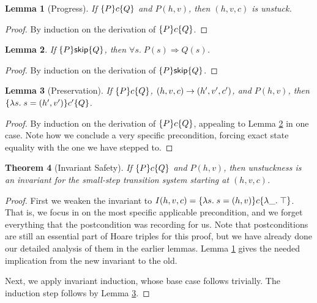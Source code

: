 \documentclass{amsbook}
\newtheorem{theorem}{Theorem}[chapter]
\newtheorem{lemma}[theorem]{Lemma}
\theoremstyle{definition}
\theoremstyle{remark}
\numberwithin{section}{chapter}
\numberwithin{equation}{chapter}
\begin{document}
\begin{lemma}[Progress]\label{hoare_progress}
  If $\{P\} c \{Q\}$ and $P(h, v)$, then $(h, v, c)$ is unstuck.
\end{lemma}
\begin{proof}
  By induction on the derivation of $\{P\} c \{Q\}$.
\end{proof}

\begin{lemma}\label{hoare_skip}
  If $\{P\} \mathsf{skip} \{Q\}$, then $\forall s. \; P(s) \Rightarrow Q(s)$.
\end{lemma}
\begin{proof}
  By induction on the derivation of $\{P\} \mathsf{skip} \{Q\}$.
\end{proof}

\begin{lemma}[Preservation]\label{hoare_preservation}
  If $\{P\} c \{Q\}$, $(h, v, c) \to (h', v', c')$, and $P(h, v)$, then $\{\lambda s. \; s = (h', v')\} c' \{Q\}$.
\end{lemma}
\begin{proof}
  By induction on the derivation of $\{P\} c \{Q\}$, appealing to Lemma \ref{hoare_skip} in one case.  Note how we conclude a very specific precondition, forcing exact state equality with the one we have stepped to.
\end{proof}

\begin{theorem}[Invariant Safety]
\invariants
  If $\{P\} c \{Q\}$ and $P(h, v)$, then unstuckness is an invariant for the small-step transition system starting at $(h, v, c)$.
\end{theorem}
\begin{proof}
  First we weaken the invariant to $I(h, v, c) = \{\lambda s. \; s = (h, v)\} c \{\lambda \_. \; \top\}$.
  That is, we focus in on the most specific applicable precondition, and we forget everything that the postcondition was recording for us.
  Note that postconditions are still an essential part of Hoare triples for this proof, but we have already done our detailed analysis of them in the earlier lemmas.
  Lemma \ref{hoare_progress} gives the needed implication from the new invariant to the old.
  
  Next, we apply invariant induction, whose base case follows trivially.
  The induction step follows by Lemma \ref{hoare_preservation}.
\end{proof}


\end{document}

